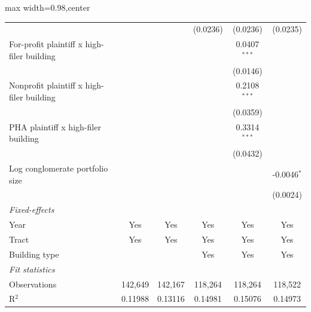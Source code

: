 \begin{table}[htbp]
\begin{adjustbox}{max width=0.98\textwidth,center}
\begin{tabular}{lccccc}
                                                    &                 &                 & (0.0236)        & (0.0236)        & (0.0235)\\   
         For-profit plaintiff x high-filer building &                 &                 &                 & 0.0407$^{***}$  &   \\   
                                                    &                 &                 &                 & (0.0146)        &   \\   
         Nonprofit plaintiff x high-filer building  &                 &                 &                 & 0.2108$^{***}$  &   \\   
                                                    &                 &                 &                 & (0.0359)        &   \\   
         PHA plaintiff x high-filer building        &                 &                 &                 & 0.3314$^{***}$  &   \\   
                                                    &                 &                 &                 & (0.0432)        &   \\   
         Log conglomerate portfolio size            &                 &                 &                 &                 & -0.0046$^{*}$\\   
                                                    &                 &                 &                 &                 & (0.0024)\\   
         \midrule
         \emph{Fixed-effects}\\
         Year                                       & Yes             & Yes             & Yes             & Yes             & Yes\\  
         Tract                                      & Yes             & Yes             & Yes             & Yes             & Yes\\  
         Building type                              &                 &                 & Yes             & Yes             & Yes\\  
         \midrule
         \emph{Fit statistics}\\
         Observations                               & 142,649         & 142,167         & 118,264         & 118,264         & 118,522\\  
         R$^2$                                      & 0.11988         & 0.13116         & 0.14981         & 0.15076         & 0.14973\\  

\end{tabular}
\end{adjustbox}
\end{table}
